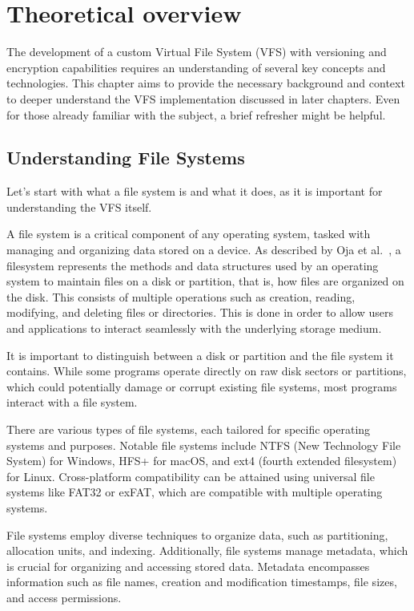 \chapter{Theoretical overview}
\label{chap:refs}

The development of a custom Virtual File System (VFS) with versioning and encryption capabilities requires an understanding of several key concepts and technologies.
This chapter aims to provide the necessary background and context to deeper understand the VFS implementation discussed in later chapters.
Even for those already familiar with the subject, a brief refresher might be helpful.


\section{Understanding File Systems}\label{sec:file-systems}

Let's start with what a file system is and what it does, as it is important for understanding the VFS itself.

A file system is a critical component of any operating system, tasked with managing and organizing data stored on a device.
As described by Oja et al.~\cite{oja-fs}, a filesystem represents the methods and data structures used by an operating system to maintain files on a disk or partition, that is, how files are organized on the disk.
This consists of multiple operations such as creation, reading, modifying, and deleting files or directories.
This is done in order to allow users and applications to interact seamlessly with the underlying storage medium.

It is important to distinguish between a disk or partition and the file system it contains.
While some programs operate directly on raw disk sectors or partitions, which could potentially damage or corrupt existing file systems, most programs interact with a file system.

There are various types of file systems, each tailored for specific operating systems and purposes.
Notable file systems include NTFS (New Technology File System) for Windows, HFS+ for macOS, and ext4 (fourth extended filesystem) for Linux.
Cross-platform compatibility can be attained using universal file systems like FAT32 or exFAT, which are compatible with multiple operating systems.

File systems employ diverse techniques to organize data, such as partitioning, allocation units, and indexing.
Additionally, file systems manage metadata, which is crucial for organizing and accessing stored data.
Metadata encompasses information such as file names, creation and modification timestamps, file sizes, and access permissions.


